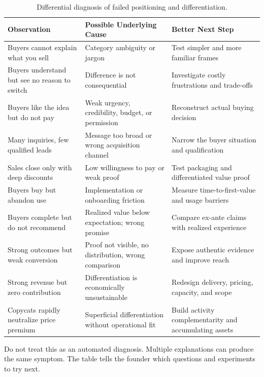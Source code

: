 \begin{table}[t]
\centering
\small
\begin{tabularx}{\textwidth}{>{\raggedright\arraybackslash}p{4.5cm} >{\raggedright\arraybackslash}p{5.5cm} >{\raggedright\arraybackslash}X}
\toprule
\textbf{Observation} & \textbf{Possible Underlying Cause} & \textbf{Better Next Step} \\
\midrule
Buyers cannot explain what you sell & Category ambiguity or jargon & Test simpler and more familiar frames \\
Buyers understand but see no reason to switch & Difference is not consequential & Investigate costly frustrations and trade-offs \\
Buyers like the idea but do not pay & Weak urgency, credibility, budget, or permission & Reconstruct actual buying decision \\
Many inquiries, few qualified leads & Message too broad or wrong acquisition channel & Narrow the buyer situation and qualification \\
Sales close only with deep discounts & Low willingness to pay or weak proof & Test packaging and differentiated value proof \\
Buyers buy but abandon use & Implementation or onboarding friction & Measure time-to-first-value and usage barriers \\
Buyers complete but do not recommend & Realized value below expectation; wrong promise & Compare ex-ante claims with realized experience \\
Strong outcomes but weak conversion & Proof not visible, no distribution, wrong comparison & Expose authentic evidence and improve reach \\
Strong revenue but zero contribution & Differentiation is economically unsustainable & Redesign delivery, pricing, capacity, and scope \\
Copycats rapidly neutralize price premium & Superficial differentiation without operational fit & Build activity complementarity and accumulating assets \\
\bottomrule
\end{tabularx}
\caption{Differential diagnosis of failed positioning and differentiation.}
\label{tab:ch8-positioning-diagnosis}
\end{table}

Do not treat this as an automated diagnosis. Multiple explanations can produce the same symptom. The table tells the founder which questions and experiments to try next.

